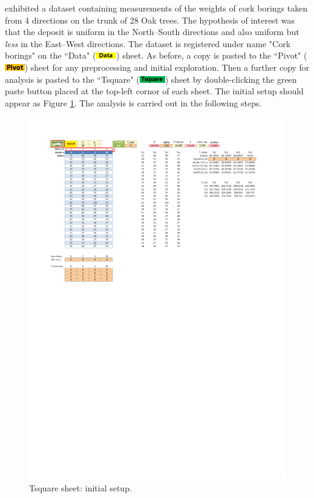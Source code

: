 \documentclass[article]{jss}
\numberwithin{equation}{subsection}
\newcommand{\shtData}{``Data" (\includegraphics[height=8pt, keepaspectratio=true]{img/DataSheetTab_png}) }
\newcommand{\shtPivot}{``Pivot" (\includegraphics[height=8pt, keepaspectratio=true]{img/PivotSheetTab_png}) }
\newcommand{\shtTsquare}{``Tsquare" (\includegraphics[height=8pt, keepaspectratio=true]{img/TsquareSheetTab_png}) }
\begin{document}
        \cite{rao1948corkboring} exhibited a dataset containing measurements of the weights of  cork borings taken from 4 directions on the trunk of 28 Oak trees. The hypothesis of interest was that the deposit is uniform in the North--South directions and also uniform but \emph{less} in the East--West directions. The dataset is registered under name "Cork borings" on the \shtData sheet. As before, a copy is pasted to the \shtPivot sheet for any preprocessing and initial exploration. Then a further copy for analysis is pasted to the \shtTsquare sheet by double-clicking the green paste button placed at the top-left cornor of each sheet. The initial setup should appear as Figure \ref{fig:corkboringinitialsetup}. The analysis is carried out in the following steps.
        \begin{figure}[!tbh]      
        	\includegraphics[width=\linewidth, keepaspectratio=true]{img/TsquareSheetAfterPaste_markup}
        	\vspace{-25pt}\centering{}\protect\caption{Tsquare sheet: initial setup.}\label{fig:corkboringinitialsetup}
        \end{figure}
\end{document}
